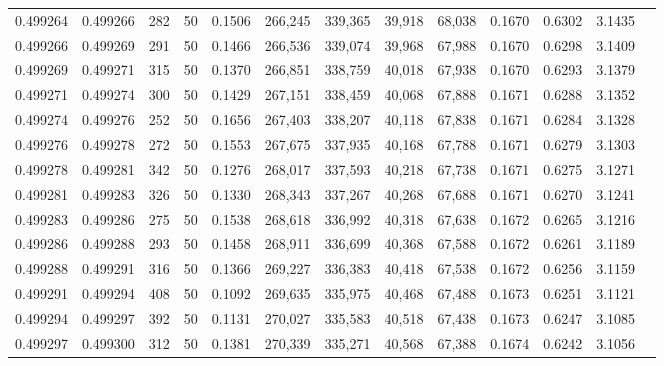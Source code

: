 \begin{tabular}{rrrrrrrrrrrrr}
0.499264 & 0.499266 & 282 &  50 &                                     0.1506 & 266,245 & 339,365 &  39,918 &  68,038 & 0.1670 & 0.6302 & 3.1435 \\
0.499266 & 0.499269 & 291 &  50 &                                     0.1466 & 266,536 & 339,074 &  39,968 &  67,988 & 0.1670 & 0.6298 & 3.1409 \\
0.499269 & 0.499271 & 315 &  50 &                                     0.1370 & 266,851 & 338,759 &  40,018 &  67,938 & 0.1670 & 0.6293 & 3.1379 \\
0.499271 & 0.499274 & 300 &  50 &                                     0.1429 & 267,151 & 338,459 &  40,068 &  67,888 & 0.1671 & 0.6288 & 3.1352 \\
0.499274 & 0.499276 & 252 &  50 &                                     0.1656 & 267,403 & 338,207 &  40,118 &  67,838 & 0.1671 & 0.6284 & 3.1328 \\
0.499276 & 0.499278 & 272 &  50 &                                     0.1553 & 267,675 & 337,935 &  40,168 &  67,788 & 0.1671 & 0.6279 & 3.1303 \\
0.499278 & 0.499281 & 342 &  50 &                                     0.1276 & 268,017 & 337,593 &  40,218 &  67,738 & 0.1671 & 0.6275 & 3.1271 \\
0.499281 & 0.499283 & 326 &  50 &                                     0.1330 & 268,343 & 337,267 &  40,268 &  67,688 & 0.1671 & 0.6270 & 3.1241 \\
0.499283 & 0.499286 & 275 &  50 &                                     0.1538 & 268,618 & 336,992 &  40,318 &  67,638 & 0.1672 & 0.6265 & 3.1216 \\
0.499286 & 0.499288 & 293 &  50 &                                     0.1458 & 268,911 & 336,699 &  40,368 &  67,588 & 0.1672 & 0.6261 & 3.1189 \\
0.499288 & 0.499291 & 316 &  50 &                                     0.1366 & 269,227 & 336,383 &  40,418 &  67,538 & 0.1672 & 0.6256 & 3.1159 \\
0.499291 & 0.499294 & 408 &  50 &                                     0.1092 & 269,635 & 335,975 &  40,468 &  67,488 & 0.1673 & 0.6251 & 3.1121 \\
0.499294 & 0.499297 & 392 &  50 &                                     0.1131 & 270,027 & 335,583 &  40,518 &  67,438 & 0.1673 & 0.6247 & 3.1085 \\
0.499297 & 0.499300 & 312 &  50 &                                     0.1381 & 270,339 & 335,271 &  40,568 &  67,388 & 0.1674 & 0.6242 & 3.1056 \\

\end{tabular}
